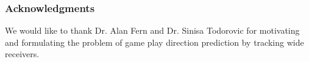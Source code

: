 \documentclass{article} %
\begin{document}
%
%
% 
% 


\subsubsection*{Acknowledgments}

We would like to thank Dr. Alan Fern and  Dr. Sinisa Todorovic for motivating and formulating the problem of game play direction prediction by tracking wide receivers.
\end{document}
